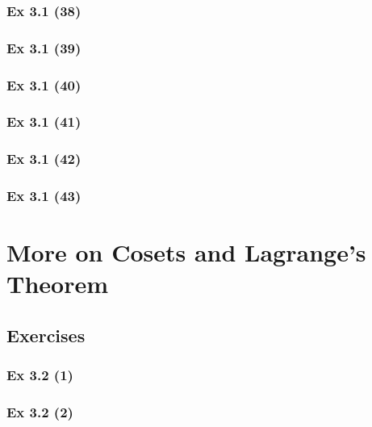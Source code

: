 \subsubsection{Ex 3.1 (38)}\label{sec:Ex_3.1.38}

\subsubsection{Ex 3.1 (39)}\label{sec:Ex_3.1.39}

\subsubsection{Ex 3.1 (40)}\label{sec:Ex_3.1.40}

\newpage		%

\subsubsection{Ex 3.1 (41)}\label{sec:Ex_3.1.41}

\subsubsection{Ex 3.1 (42)}\label{sec:Ex_3.1.42}

\subsubsection{Ex 3.1 (43)}\label{sec:Ex_3.1.43}

\newpage		%

\section{More on Cosets and Lagrange's Theorem}\label{sec:3.2}	
\subsection*{Exercises}\label{sec:3.2_Exercises}

\subsubsection{Ex 3.2 (1)}\label{sec:Ex_3.2.1}

\subsubsection{Ex 3.2 (2)}\label{sec:Ex_3.2.2}

